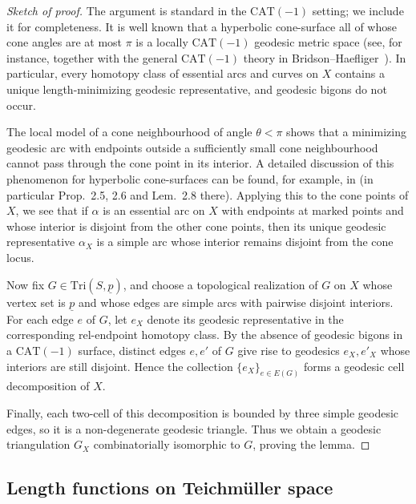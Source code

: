 \documentclass[11pt, letterpaper]{amsart}
\theoremstyle{definition}
\theoremstyle{remark}
\newcommand{\up}{\underline{p}}
\newcommand{\Sp}{(S,\up)}
\newcommand{\TSp}{\text{Tri}\Sp}
\numberwithin{equation}{section}
\begin{document}
\begin{proof}[Sketch of proof]
The argument is standard in the \(\mathrm{CAT}(-1)\) setting; we include it for
completeness.
It is well known that a hyperbolic cone-surface all of whose cone angles are at
most \(\pi\) is a locally \(\mathrm{CAT}(-1)\) geodesic metric space (see, for instance,
\cite{TWZ06} together with the general \(\mathrm{CAT}(-1)\) theory in
Bridson--Haefliger~\cite{BH99}).
In particular, every homotopy class of essential arcs and curves on \(X\)
contains a unique length-minimizing geodesic representative, and geodesic
bigons do not occur.

The local model of a cone neighbourhood of angle \(\theta<\pi\) shows that
a minimizing geodesic arc with endpoints outside a sufficiently small
cone neighbourhood cannot pass through the cone point in its interior.
A detailed discussion of this phenomenon for hyperbolic cone-surfaces can be
found, for example, in \cite[Section~2]{Nai25} (in particular Prop.~2.5,
2.6 and Lem.~2.8 there).
Applying this to the cone points of \(X\), we see that if \(\alpha\) is
an essential arc on \(X\) with endpoints at marked points and whose interior is disjoint from the other cone points, then its unique geodesic representative \(\alpha_X\) is a simple arc whose interior remains disjoint from the cone locus.

Now fix \(G\in\TSp\), and choose a topological realization of \(G\) on \(X\)
whose vertex set is \(\underline p\) and whose edges are simple
arcs with pairwise disjoint interiors.
For each edge \(e\) of \(G\), let \(e_X\) denote its geodesic representative in the corresponding rel-endpoint homotopy class.
By the absence of geodesic bigons in a \(\mathrm{CAT}(-1)\) surface,
distinct edges \(e,e'\) of \(G\) give rise to geodesics
\(e_X, e'_X\) whose interiors are still disjoint.
Hence the collection \(\{e_X\}_{e\in E(G)}\) forms a geodesic cell
decomposition of \(X\).

Finally, each two-cell of this decomposition is bounded by three simple
geodesic edges, so it is a non-degenerate geodesic triangle.
Thus we obtain a geodesic triangulation \(G_X\) combinatorially
isomorphic to \(G\), proving the lemma.
\end{proof}


    
\subsection{Length functions on Teichm\"uller space}
\label{subsubsec:length.func.}
\end{document}
